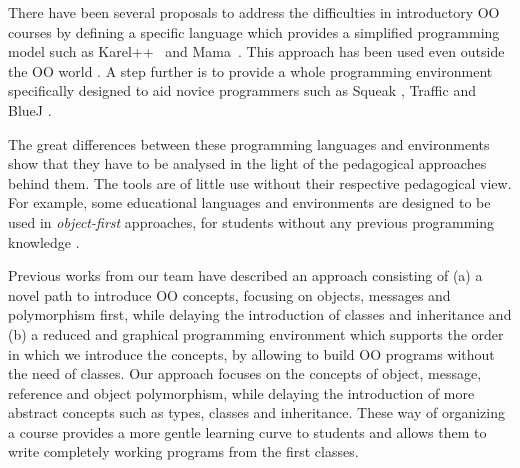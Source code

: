 \medskip 



There have been several proposals to address the difficulties in introductory OO courses 
by defining a specific language which provides a simplified programming model such as Karel++~\cite{bergin_karel++:_1996} and Mama~\cite{harrisonmama}.
This approach has been used even outside the OO world \cite{feurzeig_programming-languages_1970, pattis_karel_1981, lopez_nombre_2012}.
A step further is to provide a whole programming environment specifically designed to aid novice programmers 
such as Squeak \cite{ingalls_back_1997}, Traffic \cite{broy_outside-method_2003} and BlueJ \cite{bennedsen_bluej_2010}. 

The great differences between these programming languages and environments show that they have to be analysed in the light of the pedagogical approaches behind them.
The tools are of little use without their respective pedagogical view.
For example, some educational languages and environments are designed to be used in \textit{object-first} approaches, 
\ie for students without any previous programming knowledge \cite{arnow_introduction_1998, bruce_library_2001}.

\medskip
Previous works from our team \cite{lombardi_instances_2007,lombardi_carlos_alumnos_2008,griggio_programming_2011,spigariol_lucas_ensenando_2013} have described an approach consisting of
(a) a novel path to introduce OO concepts, focusing on objects, messages and polymorphism first, while delaying the introduction of classes and inheritance and 
(b) a reduced and graphical programming environment which supports the order in which we introduce the concepts, by allowing to build OO programs without the need of classes.
Our approach focuses on the concepts of object, message, reference and object polymorphism, while delaying the introduction of more abstract concepts such as types, classes and inheritance.
These way of organizing a course provides a more gentle learning curve to students and allows them to write completely working programs from the first classes.

